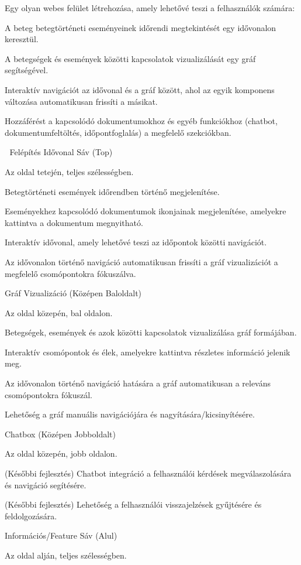 Egy olyan webes felület létrehozása, amely lehetővé teszi a felhasználók számára:​

A beteg betegtörténeti eseményeinek időrendi megtekintését egy idővonalon keresztül.​

A betegségek és események közötti kapcsolatok vizualizálását egy gráf segítségével.​

Interaktív navigációt az idővonal és a gráf között, ahol az egyik komponens változása automatikusan frissíti a másikat.​

Hozzáférést a kapcsolódó dokumentumokhoz és egyéb funkciókhoz (chatbot, dokumentumfeltöltés, időpontfoglalás) a megfelelő szekciókban.​

🧱 Felépítés
Idővonal Sáv (Top)

Az oldal tetején, teljes szélességben.​

Betegtörténeti események időrendben történő megjelenítése.​

Eseményekhez kapcsolódó dokumentumok ikonjainak megjelenítése, amelyekre kattintva a dokumentum megnyitható.​

Interaktív idővonal, amely lehetővé teszi az időpontok közötti navigációt.​

Az idővonalon történő navigáció automatikusan frissíti a gráf vizualizációt a megfelelő csomópontokra fókuszálva.​

Gráf Vizualizáció (Középen Baloldalt)

Az oldal közepén, bal oldalon.​

Betegségek, események és azok közötti kapcsolatok vizualizálása gráf formájában.​

Interaktív csomópontok és élek, amelyekre kattintva részletes információ jelenik meg.​

Az idővonalon történő navigáció hatására a gráf automatikusan a releváns csomópontokra fókuszál.​

Lehetőség a gráf manuális navigációjára és nagyítására/kicsinyítésére.​

Chatbox (Középen Jobboldalt)

Az oldal közepén, jobb oldalon.​

(Későbbi fejlesztés) Chatbot integráció a felhasználói kérdések megválaszolására és navigáció segítésére.​

(Későbbi fejlesztés) Lehetőség a felhasználói visszajelzések gyűjtésére és feldolgozására.​

Információs/Feature Sáv (Alul)

Az oldal alján, teljes szélességben.​

